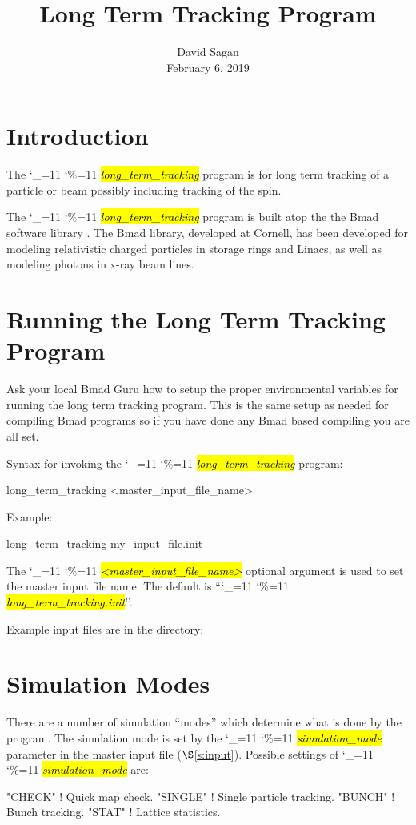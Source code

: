 \documentclass{hitec}
\title{Long Term Tracking Program}
\author{}
\date{David Sagan \\ February 6, 2019}
\newcommand\dottcmd[1]{\hl{\em#1}\endgroup}
\newcommand{\vn}{\begingroup\catcode`\_=11 \catcode`\%=11 \dottcmd}
\newcommand{\ltt}{\vn{long_term_tracking}\xspace}
\newcommand{\sref}[1]{$\S$\ref{#1}}
\newcommand{\Section}[1]{\section{#1}\vspace*{-1ex}}
\begin{document}
\maketitle

\tableofcontents


\Section{Introduction} 

The \ltt program is for long term tracking of a particle or beam possibly
including tracking of the spin.

The \ltt program is built atop the the Bmad software library \cite{b:bmad}. The Bmad library,
developed at Cornell, has been developed for modeling relativistic charged particles in storage
rings and Linacs, as well as modeling photons in x-ray beam lines.

\Section{Running the Long Term Tracking Program} 
\label{s:run}

Ask your local Bmad Guru how to setup the proper environmental variables for running the long term
tracking program. This is the same setup as needed for compiling Bmad programs so if you have done
any Bmad based compiling you are all set. 

Syntax for invoking the \ltt program:
\begin{code}
  long_term_tracking {<master_input_file_name>}
\end{code}
Example:
\begin{code}
  long_term_tracking my_input_file.init
\end{code}
The \vn{<master_input_file_name>} optional argument is used to set the master input file name. The
default is ``\vn{long_term_tracking.init}''.

Example input files are in the directory:

\Section{Simulation Modes}
\label{s:sim.modes}

There are a number of simulation ``modes'' which determine what is done by the program. The
simulation mode is set by the \vn{simulation_mode} parameter in the master input file
(\sref{s:input}).  Possible settings of \vn{simulation_mode} are:
\begin{code}
  "CHECK"   ! Quick map check.
  "SINGLE"  ! Single particle tracking.
  "BUNCH"   ! Bunch tracking.
  "STAT"    ! Lattice statistics.
\end{code}
\end{document}
